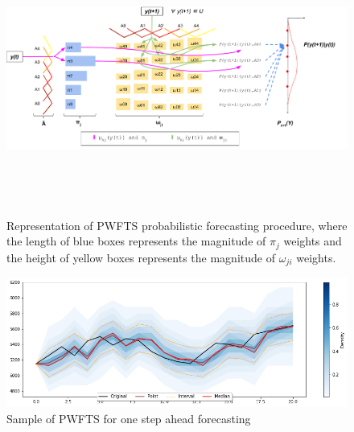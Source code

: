 \begin{figure}[htb]
    \centering
    \includegraphics[width=\textwidth,height=9cm]{figures/pwfts_probabilistic_forecasting.pdf}
    \caption{Representation of PWFTS probabilistic forecasting procedure, where the length of blue boxes represents the magnitude of $\pi_j$ weights and the height of yellow boxes represents the magnitude of $\omega_{ji}$ weights.}
    \label{fig:pwfts_probabilistic_forecasting}
\end{figure}

\begin{figure}[htb]
    \centering
    \includegraphics[width=\textwidth]{figures/pwfts_sample_onestep.png}
    \caption{Sample of PWFTS for one step ahead forecasting}
    \label{fig:pwfts_sample_onestep}
\end{figure}

